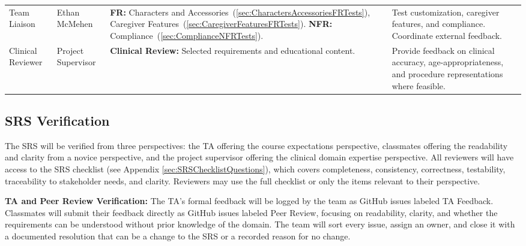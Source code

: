 \documentclass[10pt,titlepage]{article}
\begin{document}
\begin{table}[H]
\begin{tabularx}{\textwidth}{
    @{}
    >{\raggedright\arraybackslash}p{2.4cm}
    >{\raggedright\arraybackslash}p{2.3cm}
    >{\raggedright\arraybackslash}p{5.2cm}
    >{\raggedright\arraybackslash}X
    @{}
}
\addlinespace[4pt]

Team Liaison &
Ethan McMehen &
\textbf{FR:}
Characters and Accessories~(\ref{sec:CharactersAccessoriesFRTests}),
Caregiver Features~(\ref{sec:CaregiverFeaturesFRTests}).
\newline
\textbf{NFR:}
Compliance~(\ref{sec:ComplianceNFRTests}). &
Test customization, caregiver
features, and compliance.
Coordinate external feedback. \\

\addlinespace[4pt]

Clinical Reviewer &
Project Supervisor &
\textbf{Clinical Review:}
Selected requirements and
educational content. &
Provide feedback on clinical accuracy,
age-appropriateness, and procedure
representations where feasible. \\

\bottomrule
\end{tabularx}
\end{table}


\subsection{SRS Verification}\label{sec:SRSVerification}

The SRS will be verified from three perspectives: the TA offering the course expectations perspective, classmates 
offering the readability and clarity from a novice perspective, and the project supervisor offering the 
clinical domain expertise perspective. All reviewers will have access to the SRS checklist (see Appendix \ref{sec:SRSChecklistQuestions}), 
which covers completeness, consistency, correctness, testability, traceability to stakeholder needs, and clarity. 
Reviewers may use the full checklist or only the items relevant to their perspective.

\textbf{TA and Peer Review Verification:} The TA's formal feedback will be logged by the team as GitHub issues labeled TA Feedback. Classmates will submit their 
feedback directly as GitHub issues labeled Peer Review, focusing on readability, clarity, and whether the requirements can 
be understood without prior knowledge of the domain. The team will sort every issue, assign an owner, and close it with a 
documented resolution that can be a change to the SRS or a recorded reason for no change. 
\end{document}
